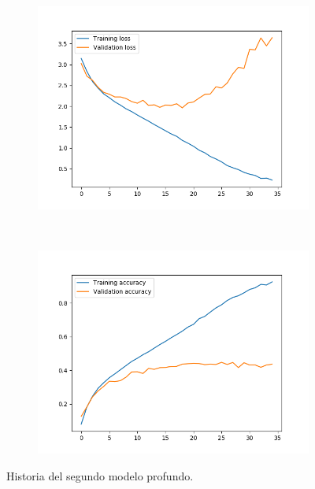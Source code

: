 \documentclass[11pt,a4paper]{article}
\begin{document}
\begin{figure}[H]
  \centering
  \begin{subfigure}{.5\textwidth}
    \includegraphics[scale=0.4]{img/deep2-nodrop-loss.png}
    \label{fig:deep2-nodrop-loss}
  \end{subfigure}%
  ~ \quad
  \begin{subfigure}{.5\textwidth}
    \includegraphics[scale=0.4]{img/deep2-nodrop-acc.png}
    \label{fig:deep2-nodrop-acc}
  \end{subfigure}
  \caption{Historia del segundo modelo profundo.}
  \label{fig:history-deep2-nodrop}
\end{figure}
\end{document}
